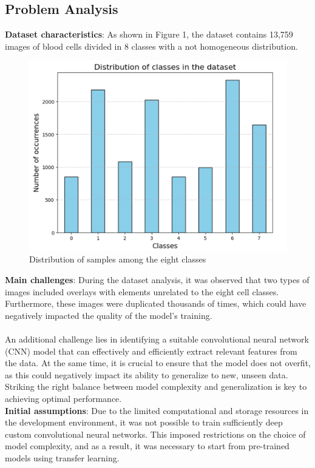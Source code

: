 \documentclass[11pt]{article}
\begin{document}
\begin{multicols}{2}
        \section{Problem Analysis}
        \textbf{Dataset characteristics}: 
            As shown in Figure 1, the dataset contains 13,759 images of blood cells divided in 8 classes with a not homogeneous distribution.
            \begin{figure}[H]
                \centering
                \includegraphics[width=0.75\linewidth]{classDistribution.png}
                \caption{Distribution of samples among the eight classes}
                \label{fig:results}
            \end{figure}
        \noindent \textbf{Main challenges}:
        During the dataset analysis, it was observed that two types of images included overlays with elements unrelated to the eight cell classes. Furthermore, these images were duplicated thousands of times, which could have negatively impacted the quality of the model's training.\\ \\
        An additional challenge lies in identifying a suitable convolutional neural network (CNN) model that can effectively and efficiently extract relevant features from the data. At the same time, it is crucial to ensure that the model does not overfit, as this could negatively impact its ability to generalize to new, unseen data. Striking the right balance between model complexity and generalization is key to achieving optimal performance.\\

        

        \noindent \textbf{Initial assumptions}: Due to the limited computational and storage resources in the development environment, it was not possible to train sufficiently deep custom convolutional neural networks. This imposed restrictions on the choice of model complexity, and as a result, it was necessary to start from pre-trained models using transfer learning.
       

\end{multicols}
\end{document}
